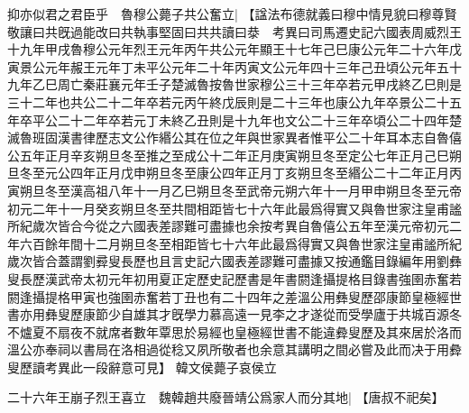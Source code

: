抑亦似君之君臣乎　魯穆公薨子共公奮立|{
	【諡法布德就義曰穆中情見貌曰穆尊賢敬讓曰共旣過能改曰共執事堅固曰共共讀曰㳟　考異曰司馬遷史記六國表周威烈王十九年甲戌魯穆公元年烈王元年丙午共公元年顯王十七年己巳康公元年二十六年戊寅景公元年赧王元年丁未平公元年二十年丙寅文公元年四十三年己丑頃公元年五十九年乙巳周亡秦莊襄元年壬子楚滅魯按魯世家穆公三十三年卒若元甲戌終乙巳則是三十二年也共公二十二年卒若元丙午終戊辰則是二十三年也康公九年卒景公二十五年卒平公二十二年卒若元丁未終乙丑則是十九年也文公二十三年卒頃公二十四年楚滅魯班固漢書律歷志文公作緡公其在位之年與世家異者惟平公二十年耳本志自魯僖公五年正月辛亥朔旦冬至推之至成公十二年正月庚寅朔旦冬至定公七年正月己巳朔旦冬至元公四年正月戊申朔旦冬至康公四年正月丁亥朔旦冬至緡公二十二年正月丙寅朔旦冬至漢高祖八年十一月乙巳朔旦冬至武帝元朔六年十一月甲申朔旦冬至元帝初元二年十一月癸亥朔旦冬至共間相距皆七十六年此最爲得實又與魯世家注皇甫謐所紀歲次皆合今從之六國表差謬難可盡據也余按考異自魯僖公五年至漢元帝初元二年六百餘年間十二月朔旦冬至相距皆七十六年此最爲得實又與魯世家注皇甫謐所紀歲次皆合蓋謂劉彛叟長歷也且言史記六國表差謬難可盡據又按通鑑目錄編年用劉彝叟長歷漢武帝太初元年初用夏正定歷史記歷書是年書閼逢攝提格目錄書強圉赤奮若閼逢攝提格甲寅也強圉赤奮若丁丑也有二十四年之差溫公用彝叟歷邵康節皇極經世書亦用彝叟歷康節少自雄其才旣學力慕高遠一見李之才遂從而受學廬于共城百源冬不爐夏不扇夜不就席者數年覃思於易經也皇極經世書不能違彜叟歷及其來居於洛而溫公亦奉祠以書局在洛相過從稔又夙所敬者也余意其講明之間必嘗及此而决于用彜叟歷讀考異此一段辭意可見】}
韓文侯薨子哀侯立
\par
二十六年王崩子烈王喜立　魏韓趙共廢晉靖公爲家人而分其地|{
	【唐叔不祀矣】}
\par
